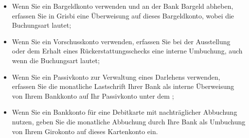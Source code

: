 \begin{itemize}
	\item Wenn Sie ein Bargeldkonto verwenden und an der Bank Bargeld abheben, erfassen Sie in Grisbi eine Überweisung auf dieses Bargeldkonto, wobei die Buchungsart  lautet;
	\item Wenn Sie ein Vorschusskonto verwenden, erfassen Sie bei der Ausstellung oder dem Erhalt eines Rückerstattungsschecks eine interne Umbuchung, auch wenn die Buchungsart  lautet;
	\item Wenn Sie ein Passivkonto zur Verwaltung eines Darlehens verwenden, erfassen Sie die monatliche Lastschrift Ihrer Bank als interne Überweisung von Ihrem Bankkonto auf Ihr Passivkonto unter dem ;
	\item Wenn Sie ein Bankkonto für eine Debitkarte mit nachträglicher Abbuchung nutzen, geben Sie die monatliche Abbuchung durch Ihre Bank als Umbuchung von Ihrem Girokonto auf dieses Kartenkonto ein.
\end{itemize}


